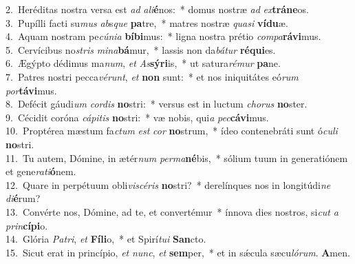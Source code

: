 {2.~}Heréditas nostra versa est \textit{ad} \textit{a}\textit{li}\textbf{é}nos:~* domus nostræ \textit{ad} \textit{ex}\textbf{trá}\textbf{ne}os.\\
{3.~}Pupílli facti su\textit{mus} \textit{ab}s\textit{que} \textbf{pa}tre,~* matres nostræ \textit{qua}\textit{si} \textbf{ví}\textbf{du}æ.\\
{4.~}Aquam nostram pe\textit{cú}\textit{ni}\textit{a} \textbf{bí}\textbf{bi}mus:~* ligna nostra prétio \textit{com}\textit{pa}\textbf{rá}\textbf{vi}mus.\\
{5.~}Cervícibus no\textit{stris} \textit{mi}\textit{na}\textbf{bá}mur,~* lassis non da\textit{bá}\textit{tur} \textbf{ré}\textbf{qui}es.\\
{6.~}Ægýpto dédimus ma\textit{num}, \textit{et} \textit{As}\textbf{sý}\textbf{ri}is,~* ut satura\textit{ré}\textit{mur} \textbf{pa}ne.\\
{7.~}Patres nostri pecca\textit{vé}\textit{runt}, \textit{et} \textbf{non} sunt:~* et nos iniquitátes eó\textit{rum} \textit{por}\textbf{tá}\textbf{vi}mus.\\
{8.~}Defécit gáudi\textit{um} \textit{cor}\textit{dis} \textbf{no}stri:~* versus est in luctum \textit{cho}\textit{rus} \textbf{no}ster.\\
{9.~}Cécidit coróna \textit{cá}\textit{pi}\textit{tis} \textbf{no}stri:~* væ nobis, qui\textit{a} \textit{pec}\textbf{cá}\textbf{vi}mus.\\
{10.~}Proptérea mæstum fa\textit{ctum} \textit{est} \textit{cor} \textbf{no}strum,~* ídeo contenebráti sunt ó\textit{cu}\textit{li} \textbf{no}stri.\\
{11.~}Tu autem, Dómine, in ætér\textit{num} \textit{per}\textit{ma}\textbf{né}bis,~* sólium tuum in generatiónem et gene\textit{ra}\textit{ti}\textbf{ó}nem.\\
{12.~}Quare in perpétuum obli\textit{vi}\textit{scé}\textit{ris} \textbf{no}stri?~* derelínques nos in longitúdi\textit{ne} \textit{di}\textbf{é}rum?\\
{13.~}Convérte nos, Dómine, ad te, et convertémur~* ínnova dies nostros, si\textit{cut} \textit{a} \textit{prin}\textbf{cí}\textbf{pi}o.\\
{14.~}Glória \textit{Pa}\textit{tri}, \textit{et} \textbf{Fí}\textbf{li}o,~* et Spirí\textit{tu}\textit{i} \textbf{San}cto.\\
{15.~}Sicut erat in princípio, \textit{et} \textit{nunc}, \textit{et} \textbf{sem}per,~* et in sǽcula sæcu\textit{ló}\textit{rum}. \textbf{A}men.\\
